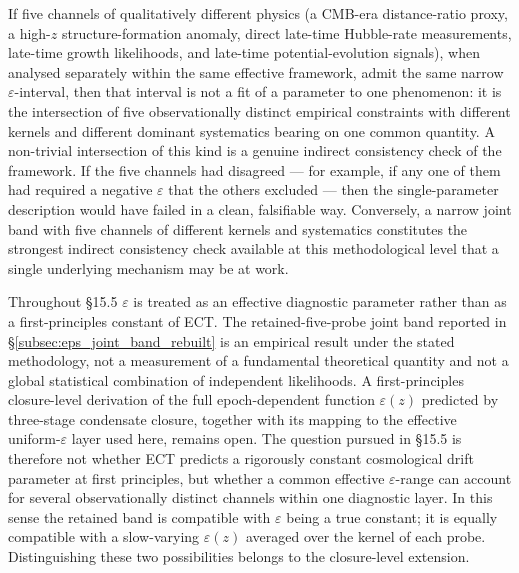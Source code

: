If five channels of qualitatively different physics (a CMB-era
distance-ratio proxy, a high-$z$ structure-formation anomaly, direct
late-time Hubble-rate measurements, late-time growth likelihoods, and
late-time potential-evolution signals), when analysed separately
within the same effective framework, admit the same narrow
$\varepsilon$-interval, then that interval is not a fit of a
parameter to one phenomenon: it is the intersection of five
observationally distinct empirical constraints with different kernels
and different dominant systematics bearing on one common quantity. A
non-trivial intersection of this kind is a genuine indirect consistency
check of the framework. If the five channels had disagreed --- for
example, if any one of them had required a negative $\varepsilon$ that
the others excluded --- then the single-parameter description would
have failed in a clean, falsifiable way. Conversely, a narrow joint
band with five channels of different kernels and systematics
constitutes the strongest indirect consistency check available at
this methodological level that a single underlying mechanism may be
at work.

Throughout \S15.5 $\varepsilon$ is treated as an effective diagnostic
parameter rather than as a first-principles constant of ECT. The
retained-five-probe joint band reported in
\S\ref{subsec:eps_joint_band_rebuilt} is an empirical result under the
stated methodology, not a measurement of a fundamental theoretical
quantity and not a global statistical combination of independent
likelihoods. A first-principles closure-level derivation of the full
epoch-dependent function $\varepsilon(z)$ predicted by three-stage
condensate closure, together with its mapping to the effective
uniform-$\varepsilon$ layer used here, remains open. The question
pursued in \S15.5 is therefore not whether ECT predicts a rigorously
constant cosmological drift parameter at first principles, but whether
a common effective $\varepsilon$-range can account for several
observationally distinct channels within one diagnostic layer. In this
sense the retained band is compatible with $\varepsilon$ being a true
constant; it is equally compatible with a slow-varying $\varepsilon(z)$
averaged over the kernel of each probe. Distinguishing these two
possibilities belongs to the closure-level extension.

